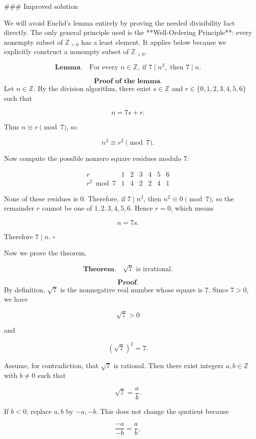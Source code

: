 ### Improved solution

We will avoid Euclid’s lemma entirely by proving the needed divisibility fact directly. The only general principle used is the **Well-Ordering Principle**: every nonempty subset of \(\mathbb Z_{>0}\) has a least element. It applies below because we explicitly construct a nonempty subset of \(\mathbb Z_{>0}\).

\[
\textbf{Lemma.}\quad \text{For every } n\in \mathbb Z,\ \text{if } 7\mid n^2,\text{ then }7\mid n.
\]

\[
\textbf{Proof of the lemma.}
\]
Let \(n\in \mathbb Z\). By the division algorithm, there exist \(s\in\mathbb Z\) and \(r\in\{0,1,2,3,4,5,6\}\) such that

\[
n=7s+r.
\]

Thus \(n\equiv r\pmod 7\), so

\[
n^2\equiv r^2\pmod 7.
\]

Now compute the possible nonzero square residues modulo \(7\):

\[
\begin{array}{c|cccccc}
r & 1 & 2 & 3 & 4 & 5 & 6\\
\hline
r^2 \bmod 7 & 1 & 4 & 2 & 2 & 4 & 1
\end{array}
\]

None of these residues is \(0\). Therefore, if \(7\mid n^2\), then \(n^2\equiv 0\pmod 7\), so the remainder \(r\) cannot be one of \(1,2,3,4,5,6\). Hence \(r=0\), which means

\[
n=7s.
\]

Therefore \(7\mid n\). \(\square\)

Now we prove the theorem.

\[
\textbf{Theorem.}\quad \sqrt 7 \text{ is irrational.}
\]

\[
\textbf{Proof.}
\]
By definition, \(\sqrt 7\) is the nonnegative real number whose square is \(7\). Since \(7>0\), we have

\[
\sqrt 7>0
\]

and

\[
(\sqrt 7)^2=7.
\]

Assume, for contradiction, that \(\sqrt 7\) is rational. Then there exist integers \(a,b\in\mathbb Z\) with \(b\neq 0\) such that

\[
\sqrt 7=\frac{a}{b}.
\]

If \(b<0\), replace \(a,b\) by \(-a,-b\). This does not change the quotient because

\[
\frac{-a}{-b}=\frac{a}{b},
\]


